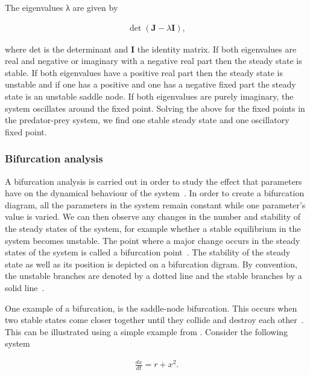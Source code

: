 \noindent The eigenvalues λ are given by

\begin{align}
\det(\mathbf{J} - λ\mathbf{I}),
\end{align}

\noindent where det is the determinant and \textbf{I} the identity matrix. If both eigenvalues are real and negative or imaginary with a negative real part then the steady state is stable. If both eigenvalues have a positive real part then the steady state is unstable and if one has a positive and one has a negative fixed part the steady state is an unstable saddle node. If both eigenvalues are purely imaginary, the system oscillates around the fixed point. Solving the above for the fixed points in the predator-prey system, we find one stable steady state and one oscillatory fixed point. 


\subsubsection{Bifurcation analysis}

A bifurcation analysis is carried out in order to study the effect that parameters have on the dynamical behaviour of the system~\autocite{Strogatz:1994}. In order to create a bifurcation diagram, all the parameters in the system remain constant while one parameter's value is varied. We can then observe any changes in the number and stability of the steady states of the system, for example whether a stable equilibrium in the system becomes unstable. The point where a major change occurs in the steady states of the system is called a bifurcation point~\autocite{iglesias:2010}. The stability of the steady state as well as its position is depicted on a bifurcation digram. By convention, the unstable branches are denoted by a dotted line and the stable branches by a solid line~\autocite{Strogatz:1994}. 

One example of a bifurcation, is the saddle-node bifurcation. This occurs when two stable states come closer together until they collide and destroy each other~\autocite{Strogatz:1994}. This can be illustrated using a simple example from \textcite{Strogatz:1994}. Consider the following system 

\begin{align*}
	\frac{dx}{dt} = r + x^2.
\end{align*}

